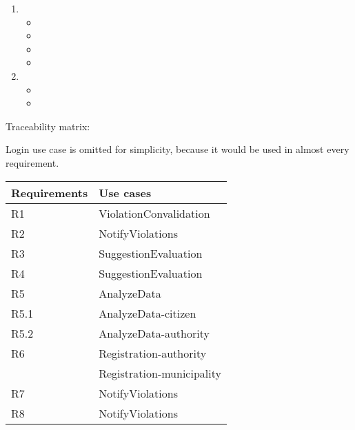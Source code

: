 \begin{enumerate}[label={}]
	\item {}
	\begin{itemize}[label={}]
		\item {}
		\item {}
		\item {}
		\item {}
	\end{itemize}
	\item {}
	\begin{itemize}[label={}]
		\item {}
		\item {}
	\end{itemize} 
\end{enumerate}

\bigskip
Traceability matrix:


Login use case is omitted for simplicity, because it would be used in almost every requirement.


\begin{tabular}{|l|>{\raggedright\arraybackslash}p{8cm}|}
	\hline 
	Requirements & Use cases \\ 
	\hline 
	R1 &  ViolationConvalidation \\ 
	\hline 
	R2 &  NotifyViolations \\ 
	\hline 
	R3 &  SuggestionEvaluation \\ 
	\hline 
	R4 &  SuggestionEvaluation \\ 
	\hline 
	R5 & AnalyzeData \\ 
	\hline 
	R5.1& AnalyzeData-citizen \\ 
	\hline 
	R5.2& AnalyzeData-authority \\ 
	\hline 
	R6 & Registration-authority \\ 
	   & Registration-municipality \\
	\hline 
	R7 & NotifyViolations \\ 
	\hline 
	R8 & NotifyViolations \\ 
	\hline 
\end{tabular} 
